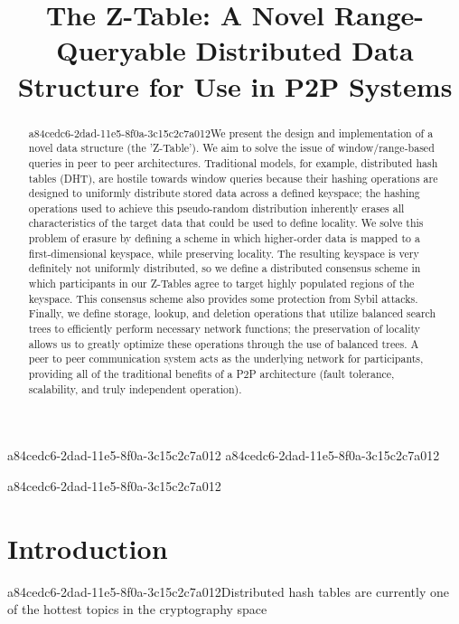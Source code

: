 \documentclass[12pt]{article}
\title{The Z-Table: A Novel Range-Queryable Distributed Data Structure for Use in P2P Systems}
\begin{document}
a84cedc6-2dad-11e5-8f0a-3c15c2c7a012
a84cedc6-2dad-11e5-8f0a-3c15c2c7a012\maketitle
a84cedc6-2dad-11e5-8f0a-3c15c2c7a012
\begin{abstract}
a84cedc6-2dad-11e5-8f0a-3c15c2c7a012We present the design and implementation of a novel data structure (the 'Z-Table'). We aim to solve the issue of window/range-based queries in peer to peer architectures. Traditional models, for example,  distributed hash tables (DHT), are hostile towards window queries because their hashing operations are designed to uniformly distribute stored data across a defined keyspace; the hashing operations used to achieve this pseudo-random distribution inherently erases all characteristics of the target data that could be used to define locality. We solve this problem of erasure by defining a scheme in which higher-order data is mapped to a first-dimensional keyspace, while preserving locality. The resulting keyspace is very definitely not uniformly distributed, so we define a distributed consensus scheme in which participants in our Z-Tables agree to target highly populated regions of the keyspace. This consensus scheme also provides some protection from Sybil attacks. Finally, we define storage, lookup, and deletion operations that utilize balanced search trees to efficiently perform necessary network functions; the preservation of locality allows us to greatly optimize these operations through the use of balanced trees. A peer to peer communication system acts as the underlying network for participants, providing all of the traditional benefits of a P2P architecture (fault tolerance, scalability, and truly independent operation).
\end{abstract}


\newpage
\section{Introduction}
a84cedc6-2dad-11e5-8f0a-3c15c2c7a012Distributed hash tables are currently one of the hottest topics in the cryptography space~\cite{Stoica:2001dj,Rowstron:2001ea,Ratnasamy:2001wn}

\printbibliography
\end{document}
